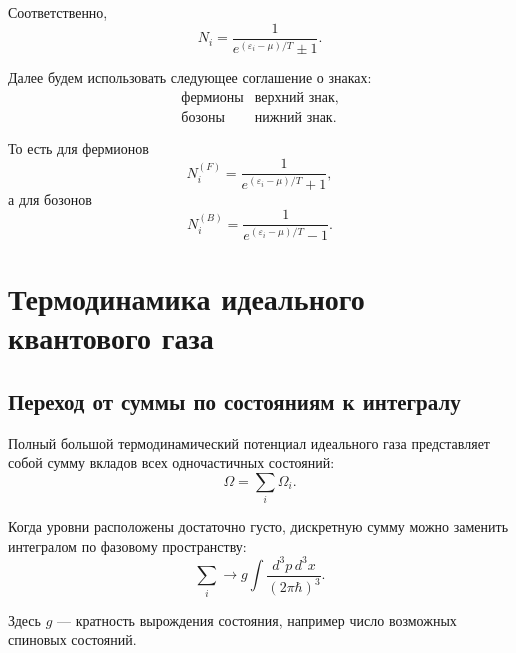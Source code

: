 \documentclass[../final.tex]{subfiles}
\begin{document}
Соответственно,
%
\[
    \boxed{
        N_i
        =
        \frac{1}{
            e^{(\varepsilon_i-\mu)/T}\pm1
        }
    }.
\]

Далее будем использовать следующее соглашение о знаках:
%
\begin{equation*}
    \begin{array}{c|c}
        \text{фермионы} & \text{верхний знак},\\
        \text{бозоны}   & \text{нижний знак}.
    \end{array}
\end{equation*}

То есть для фермионов
%
\begin{equation*}
    N_i^{(F)}
    =
    \frac{1}{
        e^{(\varepsilon_i-\mu)/T}+1
    },
\end{equation*}
%
а для бозонов
%
\begin{equation*}
    N_i^{(B)}
    =
    \frac{1}{
        e^{(\varepsilon_i-\mu)/T}-1
    }.
\end{equation*}


\section{Термодинамика идеального квантового газа}


\subsection{Переход от суммы по состояниям к интегралу}

Полный большой термодинамический потенциал идеального газа
представляет собой сумму вкладов всех одночастичных состояний:
%
\begin{equation*}
    \Omega
    =
    \sum_i
    \Omega_i.
\end{equation*}

Когда уровни расположены достаточно густо, дискретную сумму можно
заменить интегралом по фазовому пространству:
%
\[
    \boxed{
        \sum_i
        \longrightarrow
        g
        \int
        \frac{
            d^3p\,d^3x
        }{
            (2\pi\hbar)^3
        }
    }.
\]

Здесь $g$ --- кратность вырождения состояния, например число
возможных спиновых состояний.
\end{document}
